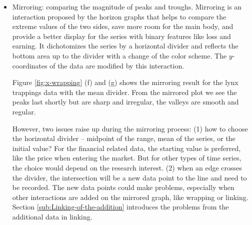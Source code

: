 \documentclass[12pt]{article}
\begin{document}
\begin{itemize}
\item Mirroring: comparing the magnitude of peaks and troughs.
Mirroring is an interaction proposed by the horizon graphs that helps
to compare the extreme values of the two sides, save more room for
the main body, and provide a better display for the series with binary
features like loss and earning. It dichotomizes the series by a horizontal
divider and reflects the bottom area up to the divider with a change
of the color scheme. The $y$-coordinates of the data are modified by
this interaction.

Figure \ref{fig:x-wrapping} (f) and (g) shows the mirroring result
for the lynx trappings data with the mean divider. From the mirrored
plot we see the peaks last shortly but are sharp and irregular, the
valleys are smooth and regular.

However, two issues raise up during the mirroring process:  (1) how
to choose the horizontal divider -- midpoint of the range, mean of
the series, or the initial value? For the financial related data,
the starting value is preferred, like the price when entering the
market. But for other types of time series, the choice would depend
on the research interest.  (2) when an edge crosses the divider, the
intersection will be a new data point to the line and need to be recorded.
The new data points could make problems, especially when other interactions
are added on the mirrored graph, like wrapping or linking. Section
\ref{sub:Linking-of-the-addition} introduces the problems from the
additional data in linking.




\end{itemize}
\end{document}
